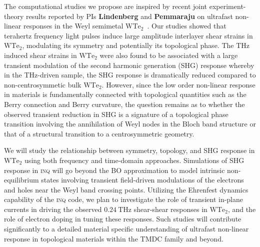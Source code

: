The computational studies we propose are inspired by recent joint experiment-theory results reported by PIs {\bf Lindenberg} and {\bf Pemmaraju} on ultrafast non-linear responses in the Weyl semimetal \(\mathrm{WTe_2}\)~\cite{Xiao_2020}. 
Our studies showed that terahertz frequency light pulses induce large amplitude interlayer shear strains in \(\mathrm{WTe_2}\), modulating its symmetry and potentially its topological phase. 
The THz induced shear strains in \(\mathrm{WTe_2}\) were also found to be associated with a large transient modulation of the second harmonic generation (SHG) response whereby in the THz-driven sample, the SHG response is dramatically reduced compared to non-centrosymmetic bulk \(\mathrm{WTe_2}\). 
However, since the low order non-linear response in materials is fundamentally connected with topological quantities such as the Berry connection and Berry curvature, the question remains as to whether the observed transient reduction in SHG is a signature of a topological phase transition involving the annihilation of Weyl nodes in the Bloch band structure or that of a structural transition to a centrosymmetric geometry.

We will study the relationship between symmetry, topology, and SHG response in \(\mathrm{WTe_2}\) using both frequency and time-domain approaches. Simulations of SHG response in \textsc{inq} will go beyond the BO approximation to model intrinsic non-equilibrium states involving transient field-driven modulations of the electrons and holes near the Weyl band crossing points.
Utilizing the Ehrenfest dynamics capability of the \textsc{inq} code, we plan to investigate the role of transient in-plane currents in driving the observed \(0.24~\mathrm{THz}\) shear-shear responses in \(\mathrm{WTe_2}\), and the role of electron doping in tuning these responses. 
Such studies will contribute significantly to a detailed material specific understanding of ultrafast non-linear response in topological materials within the TMDC family and beyond.

\clearpage

